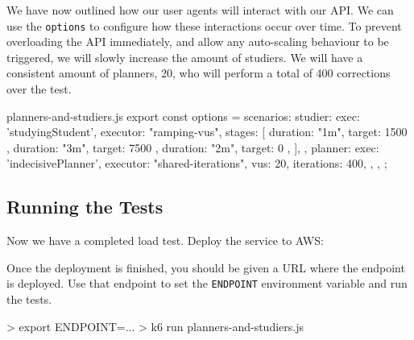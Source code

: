 \documentclass{csse4400}
\begin{document}
We have now outlined how our user agents will interact with our API.
We can use the \texttt{options} to configure how these interactions occur over time.
To prevent overloading the API immediately,
and allow any auto-scaling behaviour to be triggered,
we will slowly increase the amount of studiers.
We will have a consistent amount of planners, 20,
who will perform a total of 400 corrections over the test.
%
\begin{code}[language=JavaScript,numbers=none]{planners-and-studiers.js}
export const options = {
    scenarios: {
        studier: {
            exec: 'studyingStudent',
            executor: "ramping-vus",
            stages: [
                { duration: "1m", target: 1500 },
                { duration: "3m", target: 7500 },
                { duration: "2m", target: 0 },
            ],
        },
        planner: {
            exec: 'indecisivePlanner',
            executor: "shared-iterations",
            vus: 20,
            iterations: 400,
        },
    },
};
\end{code}

\subsection{Running the Tests}

Now we have a completed load test.
Deploy the service to AWS:


Once the deployment is finished,
you should be given a URL where the endpoint is deployed.
Use that endpoint to set the \texttt{ENDPOINT} environment variable and run the tests.
%
\begin{code}[language=bash,numbers=none]{}
> export ENDPOINT=...
> k6 run planners-and-studiers.js
\end{code}
\end{document}
